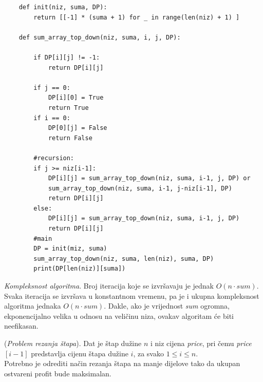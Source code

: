    \begin{verbatim}
	def init(niz, suma, DP):
		return [[-1] * (suma + 1) for _ in range(len(niz) + 1) ]
	
	def sum_array_top_down(niz, suma, i, j, DP):
	
		if DP[i][j] != -1:
			return DP[i][j]
	
		if j == 0:
			DP[i][0] = True
			return True 
		if i == 0: 
			DP[0][j] = False
			return False
			
		#recursion: 
		if j >= niz[i-1]:  
			DP[i][j] = sum_array_top_down(niz, suma, i-1, j, DP) or
			sum_array_top_down(niz, suma, i-1, j-niz[i-1], DP)
			return DP[i][j]
		else:
			DP[i][j] = sum_array_top_down(niz, suma, i-1, j, DP)
			return DP[i][j]
		#main 
		DP = init(miz, suma)
		sum_array_top_down(niz, suma, len(niz), suma, DP) 
		print(DP[len(niz)][suma])
\end{verbatim}  

\textit{Kompleksnost algoritma}. Broj iteracija koje se izvršavaju je jednak $O(n \cdot sum)$. Svaka iteracija se izvršava u konstantnom vremenu, pa je i ukupna kompleksnost algoritma jednaka  $O(n \cdot sum)$. Dakle, ako je vrijednost \emph{sum} ogromna, ekponencijalno velika u odnosu na veličinu niza, ovakav algoritam će biti neefikasan. 

\begin{example}
	(\textit{Problem rezanja štapa}). Dat je štap dužine $n$ i niz cijena \textit{price}, pri čemu \textit{price}$[i-1]$ predstavlja cijenu štapa dužine $i$, za svako $1 \leq i \leq n$.\\ 
	
	Potrebno je odrediti način rezanja štapa na manje dijelove tako da ukupan ostvareni profit bude maksimalan.
	
\end{example}

